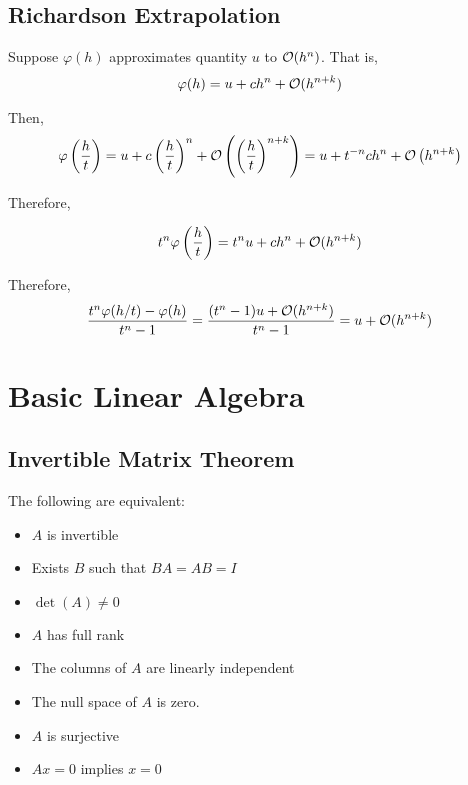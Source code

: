 \documentclass[12pt]{article}
\begin{document}
\subsection{Richardson Extrapolation}                                                                                                                       
Suppose \( \varphi(h) \) approximates quantity \( u \) to \( \mathcal{O}(h^n) \). That is,
\begin{align*}
    \varphi(h) = u + c h^n + \mathcal{O}(h^{n+k})
\end{align*}

Then,                                                                                                                                                    
\begin{align*}
    \varphi \left( \frac{h}{t} \right) = u + c \left( \frac{h}{t} \right)^n + \mathcal{O} \left( \left( \frac{h}{t} \right)^{n+k} \right)
    = u + t^{-n} c h^n + \mathcal{O}\left( h^{n+k} \right)
\end{align*}

Therefore,

\begin{align*}
    t^n \varphi \left( \frac{h}{t} \right) = t^n u + c h^n + \mathcal{O}(h^{n+k})
\end{align*}


Therefore,   
\begin{align*}                                                                                                                                           
    \frac{t^n \varphi(h/t) - \varphi(h)}{t^n-1}
    = \frac{(t^n-1)u + \mathcal{O}(h^{n+k})}{t^n-1}                                                                                                              = u + \mathcal{O}(h^{n+k})                                                                                                                                 
\end{align*}  

\pagebreak
\section{Basic Linear Algebra}

\subsection{Invertible Matrix Theorem}
The following are equivalent:
\begin{itemize}[nolistsep]
    \item \( A \) is invertible
    \item Exists \( B \) such that \( BA = AB = I \)
    \item \( \det(A) \neq 0 \)
    \item \( A \) has full rank
    \item The columns of \( A \) are linearly independent
    \item The null space of \( A \) is zero.
    \item \( A \) is surjective
    \item \( Ax = 0 \) implies \( x = 0 \)
\end{itemize}
\end{document}
